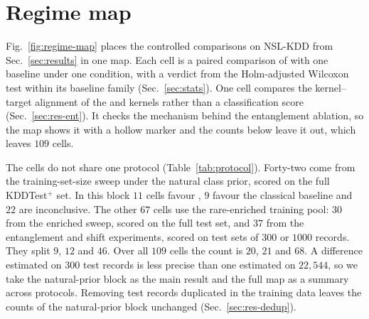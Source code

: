 \section{Regime map}\label{sec:regime}




Fig.~\ref{fig:regime-map} places the controlled comparisons on NSL-KDD from
Sec.~\ref{sec:results} in one map. Each cell is a paired comparison of \QSVM{}
with one baseline under one condition, with a verdict from the Holm-adjusted Wilcoxon test within
its baseline family (Sec.~\ref{sec:stats}). One cell compares the kernel--target alignment of the
\ZZ{} and \Zmap{} kernels rather than a classification score (Sec.~\ref{sec:res-ent}). It checks
the mechanism behind the entanglement ablation, so the map shows it with a hollow marker and
the counts below leave it out, which leaves $109$ cells.

The cells do not share one protocol (Table~\ref{tab:protocol}). Forty-two come from the
training-set-size sweep under the natural class prior, scored on the full KDDTest$^+$ set. In
this block $11$ cells favour \QSVM{}, $9$ favour the classical baseline and $22$ are
inconclusive. The other $67$ cells use the rare-enriched training pool: $30$ from the enriched
sweep, scored on the full test set, and $37$ from the entanglement and shift experiments, scored
on test sets of $300$ or $1000$ records. They split $9$, $12$ and $46$. Over all $109$ cells the
count is $20$, $21$ and $68$. A difference estimated on $300$ test records is less precise than
one estimated on $22{,}544$, so we take the natural-prior block as the main result and the full
map as a summary across protocols. Removing test records duplicated in the training data leaves
the counts of the natural-prior block unchanged (Sec.~\ref{sec:res-dedup}).

